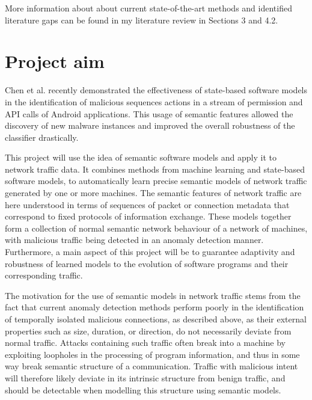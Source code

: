 \documentclass[a4paper,12pt,twoside]{report}
\begin{document}
More information about about current state-of-the-art methods and identified literature gaps can be found in my literature review in Sections 3 and 4.2.

\section{Project aim}

Chen et al. \cite{chen_2016_robust,chen_more_2016} recently demonstrated the effectiveness of state-based software models in the identification of malicious sequences actions in a stream of permission and API calls of Android applications. This usage of semantic features allowed the discovery of new malware instances and improved the overall robustness of the classifier drastically. 

This project will use the idea of semantic software models and apply it to network traffic data. It combines methods from machine learning and state-based software models, to automatically learn precise semantic models of network traffic generated by one or more machines. The semantic features of network traffic are here understood in terms of sequences of packet or connection metadata that correspond to fixed protocols of information exchange. These models together form a collection of normal semantic network behaviour of a network of machines, with malicious traffic being detected in an anomaly detection manner. Furthermore, a main aspect of this project will be to guarantee adaptivity and robustness of learned models to the evolution of software programs and their corresponding traffic. 

The motivation for the use of semantic models in network traffic stems from the fact that current anomaly detection methods perform poorly in the identification of temporally isolated malicious connections, as described above, as their external properties such as size, duration, or direction, do not necessarily deviate from normal traffic. Attacks containing such traffic often break into a machine by exploiting loopholes in the processing of program information, and thus in some way  break semantic structure of a communication. Traffic with malicious intent will therefore likely deviate in its intrinsic structure from benign traffic, and should be detectable when modelling this structure using semantic models.
\end{document}
